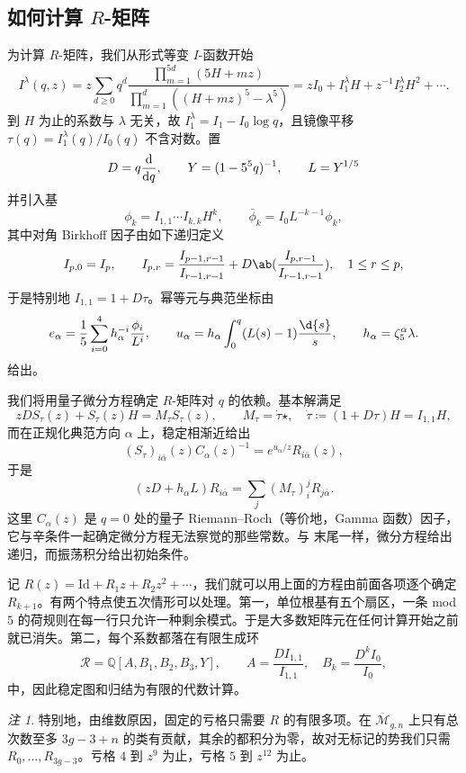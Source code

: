 \documentclass{amsart}
\theoremstyle{definition}
\theoremstyle{remark}
\newtheorem{rmk}[thm]{注}
\theoremstyle{plain}
\theoremstyle{definition}
\theoremstyle{remark}
\newcommand{\Q}{\mathbb{Q}}
\newcommand{\Mbar}{\overline{\mathcal{M}}}
\newcommand{\mc}[1]{\mathcal{#1}}
\newcommand{\mr}[1]{\mathrm{#1}}
\newcommand{\1}{\mathbf{1}}
\newcommand{\2}{\mathbf{2}}
\newcommand{\3}{\mathbf{3}}
\begin{document}
\subsection{如何计算 \(R\)-矩阵}%
\label{sub:How to compute the R-matrix (Guo)}

为计算 \(R\)-矩阵，我们从形式等变 \(I\)-函数开始
\[ I^{\lambda}(q,z) = z\sum_{d\geq0}q^d \frac{\prod_{m=1}^{5d}(5H+mz)}{\prod_{m=1}^d ((H+mz)^5 - \lambda^5)} = zI_0 + I_1^{\lambda}H + z^{-1}I_2^{\lambda}H^2 + \cdots. \]
到 \(H\) 为止的系数与 \(\lambda\) 无关，故 \(I_1^{\lambda} = I_1 - I_0 \log q\)，且镜像平移 \(\tau(q) = I_1^{\lambda}(q)/I_0(q)\) 不含对数。置
\[ D = q\odv{}{q}, \qquad Y = (1-5^5q)^{-1}, \qquad L = Y^{1/5} \]
并引入基
\[ \phi_k = I_{1,1}\cdots I_{k,k}H^k, \qquad \bar{\phi}_k = I_0 L^{-k-1}\phi_k, \]
其中对角 Birkhoff 因子由如下递归定义
\[ I_{p,0} = I_p, \qquad I_{p,r} = \frac{I_{p-1,r-1}}{I_{r-1,r-1}} + D \ab( \frac{I_{p,r-1}}{I_{r-1,r-1}}), \quad 1 \leq r \leq p, \]
于是特别地 \(I_{1,1} = 1+D\tau\)。幂等元与典范坐标由
\[ e_{\alpha} = \frac{1}{5}\sum_{i=0}^4 h_{\alpha}^{-i}\frac{\phi_i}{L^i}, \qquad u_{\alpha} = h_{\alpha}\int_0^q (L(s)-1)\frac{\d{s}}{s}, \qquad h_{\alpha} = \zeta_5^{\alpha}\lambda. \]
给出。

我们将用量子微分方程确定 \(R\)-矩阵对 \(q\) 的依赖。基本解满足
\[ zDS_{\tau}(z) + S_{\tau}(z)H = M_{\tau}S_{\tau}(z), \qquad M_{\tau} = \dot{\tau}\star, \quad \dot{\tau} \coloneqq (1+D\tau)H = I_{1,1}H, \]
而在正规化典范方向 \(\alpha\) 上，稳定相渐近给出
\[ (S_{\tau})_{i\bar{\alpha}}(z)C_{\alpha}(z)^{-1} = e^{u_{\alpha}/z}R_{i\bar{\alpha}}(z), \]
于是
\[ (zD+h_{\alpha}L)R_{i\bar{\alpha}} = \sum_j (M_{\tau})_i^j R_{j\bar{\alpha}}. \]
这里 \(C_{\alpha}(z)\) 是 \(q=0\) 处的量子 Riemann–Roch（等价地，Gamma 函数）因子，它与辛条件一起确定微分方程无法察觉的那些常数。与  末尾一样，微分方程给出递归，而振荡积分给出初始条件。

记 \(R(z) = \mr{Id} + R_1 z + R_2 z^2 + \cdots\)，我们就可以用上面的方程由前面各项逐个确定 \(R_{k+1}\)。有两个特点使五次情形可以处理。第一，单位根基有五个扇区，一条 mod \(5\) 的荷规则在每一行只允许一种剩余模式。于是大多数矩阵元在任何计算开始之前就已消失。第二，每个系数都落在有限生成环
\[ \mc{R} = \Q[A,B_1,B_2,B_3,Y], \qquad A = \frac{DI_{1,1}}{I_{1,1}}, \quad B_k = \frac{D^k I_0}{I_0}, \]
中，因此稳定图和归结为有限的代数计算。

\begin{rmk}
    特别地，由维数原因，固定的亏格只需要 \(R\) 的有限多项。在 \(\Mbar_{g,n}\) 上只有总次数至多 \(3g-3+n\) 的类有贡献，其余的都积分为零，故对无标记的势我们只需 \(R_0, \ldots, R_{3g-3}\)。亏格 \(4\) 到 \(z^9\) 为止，亏格 \(5\) 到 \(z^{12}\) 为止。
\end{rmk}
\end{document}
